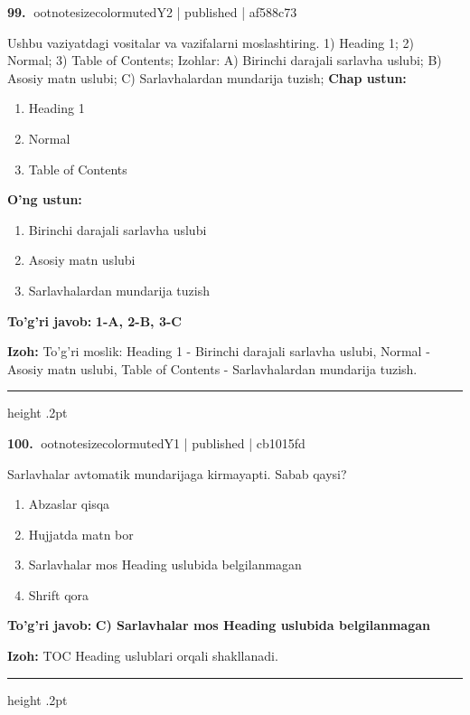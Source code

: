 \documentclass[10pt,a4paper]{article}
\begin{document}
\textbf{\color{ink}99.} {ootnotesizecolor{muted}Y2 | published | af588c73}
\par
Ushbu vaziyatdagi vositalar va vazifalarni moslashtiring.  1) Heading 1;  2) Normal;  3) Table of Contents;  Izohlar: A) Birinchi darajali sarlavha uslubi;  B) Asosiy matn uslubi;  C) Sarlavhalardan mundarija tuzish;
\textbf{Chap ustun:}\begin{enumerate}[label=\arabic*),leftmargin=9mm]
\item Heading 1
\item Normal
\item Table of Contents
\end{enumerate}
\textbf{O'ng ustun:}\begin{enumerate}[label=\Alph*),leftmargin=9mm]
\item Birinchi darajali sarlavha uslubi
\item Asosiy matn uslubi
\item Sarlavhalardan mundarija tuzish
\end{enumerate}
\begin{tcolorbox}[enhanced,breakable,colback=teal!4,colframe=teal!55!black,boxrule=0.45pt,arc=1.2mm,left=2.8mm,right=2.8mm,top=2mm,bottom=2mm]
\textbf{\color{teal}To'g'ri javob:} \textbf{1-A, 2-B, 3-C}
\par\smallskip
\textbf{Izoh:} To'g'ri moslik: Heading 1 - Birinchi darajali sarlavha uslubi, Normal - Asosiy matn uslubi, Table of Contents - Sarlavhalardan mundarija tuzish.
\end{tcolorbox}
\vspace{2mm}\hrule height .2pt\vspace{2mm}

\textbf{\color{ink}100.} {ootnotesizecolor{muted}Y1 | published | cb1015fd}
\par
Sarlavhalar avtomatik mundarijaga kirmayapti. Sabab qaysi?
\begin{enumerate}[label=\Alph*),leftmargin=9mm]
\item Abzaslar qisqa
\item Hujjatda matn bor
\item Sarlavhalar mos Heading uslubida belgilanmagan
\item Shrift qora
\end{enumerate}
\begin{tcolorbox}[enhanced,breakable,colback=teal!4,colframe=teal!55!black,boxrule=0.45pt,arc=1.2mm,left=2.8mm,right=2.8mm,top=2mm,bottom=2mm]
\textbf{\color{teal}To'g'ri javob:} \textbf{C) Sarlavhalar mos Heading uslubida belgilanmagan}
\par\smallskip
\textbf{Izoh:} TOC Heading uslublari orqali shakllanadi.
\end{tcolorbox}
\vspace{2mm}\hrule height .2pt\vspace{2mm}
\end{document}
